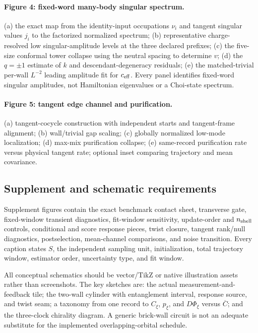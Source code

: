 \documentclass[aps,prx,twocolumn,floatfix,nofootinbib,superscriptaddress,longbibliography]{revtex4-2}
\newcommand{\avg}[1]{\overline{#1}}
\begin{document}
\paragraph*{Figure 4: fixed-word many-body singular spectrum.}
(a) the exact map from the identity-input occupations $\nu_i$ and tangent singular values
$j_i$ to the factorized normalized spectrum; (b) representative charge-resolved low
singular-amplitude levels at the three declared prefixes; (c) the five-size conformal
tower collapse using the neutral spacing to determine $v$; (d) the $q=\pm1$ estimate of
$k$ and descendant-degeneracy residuals; (e) the matched-trivial per-wall $L^{-2}$ leading
amplitude fit for $c_{\rm eff}$.  Every panel identifies fixed-word singular amplitudes,
not Hamiltonian eigenvalues or a Choi-state spectrum.

\paragraph*{Figure 5: tangent edge channel and purification.}
(a) tangent-cocycle construction with independent starts and tangent-frame alignment;
(b) wall/trivial gap
scaling; (c) globally normalized low-mode localization; (d) max-mix purification collapse;
(e) same-record purification rate versus physical tangent rate; optional inset comparing
trajectory and mean covariance.

\subsection{Supplement and schematic requirements}
Supplement figures contain the exact benchmark contact sheet, transverse gate, fixed-window
transient diagnostics, fit-window sensitivity, update-order and $n_{\rm shell}$ controls, conditional
and score response pieces, twist closure, tangent rank/null diagnostics, postselection,
mean-channel comparisons, and noise transition.  Every caption states $S$, the independent
sampling unit, initialization, total trajectory window, estimator order, uncertainty type,
and fit window.

All conceptual schematics should be vector/TikZ or native illustration assets rather than
screenshots.  The key sketches are: the actual measurement-and-feedback tile; the two-wall
cylinder with entanglement interval, response source, and twist seam; a taxonomy from one
record to $C_\xi$, $p_\xi$, and $D\Phi_\xi$ versus $\avg C$; and the three-clock chirality
diagram.  A generic brick-wall circuit is not an adequate substitute for the implemented
overlapping-orbital schedule.
\end{document}
